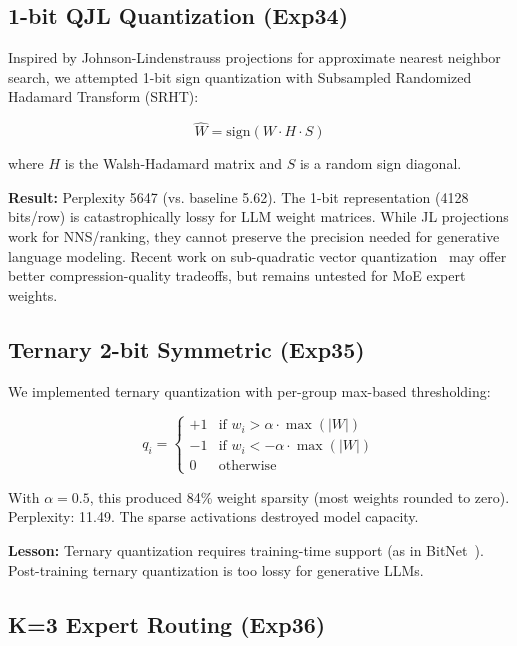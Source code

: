 \documentclass[11pt,twocolumn]{article}
\begin{document}
\subsection{1-bit QJL Quantization (Exp34)}

Inspired by Johnson-Lindenstrauss projections for approximate nearest neighbor search, we attempted 1-bit sign quantization with Subsampled Randomized Hadamard Transform (SRHT):

\begin{equation}
\hat{W} = \text{sign}(W \cdot H \cdot S)
\end{equation}

where $H$ is the Walsh-Hadamard matrix and $S$ is a random sign diagonal.

\textbf{Result:} Perplexity 5647 (vs. baseline 5.62). The 1-bit representation (4128 bits/row) is catastrophically lossy for LLM weight matrices. While JL projections work for NNS/ranking, they cannot preserve the precision needed for generative language modeling. Recent work on sub-quadratic vector quantization~\cite{turboquant} may offer better compression-quality tradeoffs, but remains untested for MoE expert weights.

\subsection{Ternary 2-bit Symmetric (Exp35)}

We implemented ternary quantization with per-group max-based thresholding:

\begin{equation}
q_i = \begin{cases}
+1 & \text{if } w_i > \alpha \cdot \max(|W|) \\
-1 & \text{if } w_i < -\alpha \cdot \max(|W|) \\
0 & \text{otherwise}
\end{cases}
\end{equation}

With $\alpha = 0.5$, this produced 84\% weight sparsity (most weights rounded to zero). Perplexity: 11.49. The sparse activations destroyed model capacity.

\textbf{Lesson:} Ternary quantization requires training-time support (as in BitNet~\cite{bitnet}). Post-training ternary quantization is too lossy for generative LLMs.

\subsection{K=3 Expert Routing (Exp36)}
\end{document}
